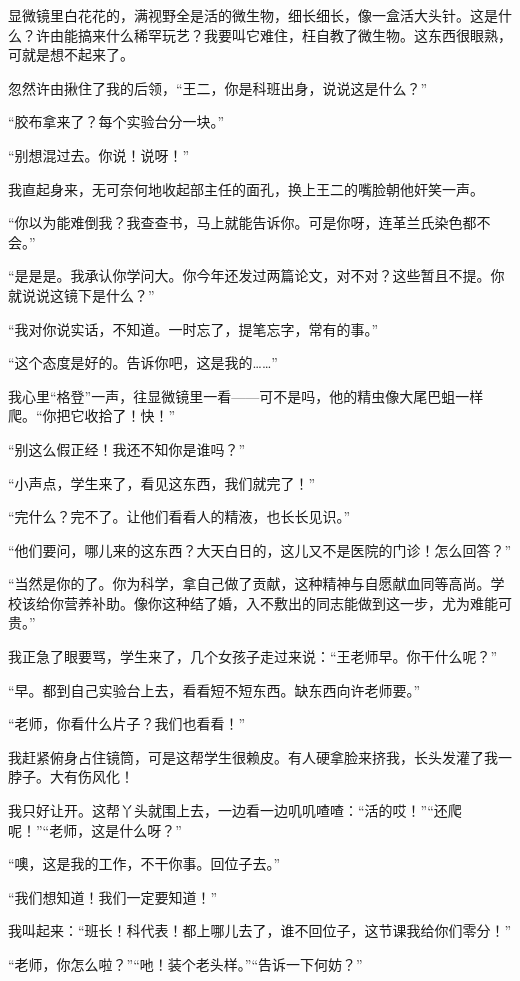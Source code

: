  显微镜里白花花的，满视野全是活的微生物，细长细长，像一盒活大头针。这是什么？许由能搞来什么稀罕玩艺？我要叫它难住，枉自教了微生物。这东西很眼熟，可就是想不起来了。 
 
 忽然许由揪住了我的后领，“王二，你是科班出身，说说这是什么？” 
 
 “胶布拿来了？每个实验台分一块。” 
 
 “别想混过去。你说！说呀！” 
 
 我直起身来，无可奈何地收起部主任的面孔，换上王二的嘴脸朝他奸笑一声。 
 
 “你以为能难倒我？我查查书，马上就能告诉你。可是你呀，连革兰氏染色都不会。” 
 
 “是是是。我承认你学问大。你今年还发过两篇论文，对不对？这些暂且不提。你就说说这镜下是什么？” 
 
 “我对你说实话，不知道。一时忘了，提笔忘字，常有的事。” 
 
 “这个态度是好的。告诉你吧，这是我的……” 
 
 我心里“格登”一声，往显微镜里一看——可不是吗，他的精虫像大尾巴蛆一样爬。“你把它收拾了！快！” 
 
 “别这么假正经！我还不知你是谁吗？” 
 
 “小声点，学生来了，看见这东西，我们就完了！” 
 
 “完什么？完不了。让他们看看人的精液，也长长见识。” 
 
 “他们要问，哪儿来的这东西？大天白日的，这儿又不是医院的门诊！怎么回答？” 
 
 “当然是你的了。你为科学，拿自己做了贡献，这种精神与自愿献血同等高尚。学校该给你营养补助。像你这种结了婚，入不敷出的同志能做到这一步，尤为难能可贵。” 
 
 我正急了眼要骂，学生来了，几个女孩子走过来说：“王老师早。你干什么呢？” 
 
 “早。都到自己实验台上去，看看短不短东西。缺东西向许老师要。” 
 
 “老师，你看什么片子？我们也看看！” 
 
 我赶紧俯身占住镜筒，可是这帮学生很赖皮。有人硬拿脸来挤我，长头发灌了我一脖子。大有伤风化！ 
 
 我只好让开。这帮丫头就围上去，一边看一边叽叽喳喳：“活的哎！”“还爬呢！”“老师，这是什么呀？” 
 
 “噢，这是我的工作，不干你事。回位子去。” 
 
 “我们想知道！我们一定要知道！” 
 
 我叫起来：“班长！科代表！都上哪儿去了，谁不回位子，这节课我给你们零分！” 
 
 “老师，你怎么啦？”“吔！装个老头样。”“告诉一下何妨？” 
 
